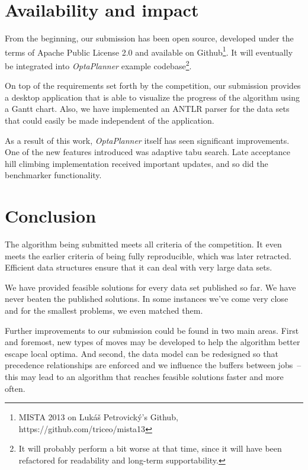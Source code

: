 \documentclass[10pt,a4paper]{article}
\begin{document}
\section{Availability and impact}

From the beginning, our submission has been open source, developed under the terms of Apache Public License 2.0 and available on Github\footnote{MISTA 2013 on Lukáš Petrovický's Github, https://github.com/triceo/mista13}. It will eventually be integrated into \textit{OptaPlanner} example codebase\footnote{It will probably perform a bit worse at that time, since it will have been refactored for readability and long-term supportability.}.

On top of the requirements set forth by the competition, our submission provides a desktop application that is able to visualize the progress of the algorithm using a Gantt chart. Also, we have implemented an ANTLR parser for the data sets that could easily be made independent of the application.

As a result of this work, \textit{OptaPlanner} itself has seen significant improvements. One of the new features introduced was adaptive tabu search. Late acceptance hill climbing implementation received important updates, and so did the benchmarker functionality.

\section{Conclusion}

The algorithm being submitted meets all criteria of the competition. It even meets the earlier criteria of being fully reproducible, which was later retracted. Efficient data structures ensure that it can deal with very large data sets.

We have provided feasible solutions for every data set published so far. We have never beaten the published solutions. In some instances we've come very close and for the smallest problems, we even matched them.

Further improvements to our submission could be found in two main areas. First and foremost, new types of moves may be developed to help the algorithm better escape local optima. And second, the data model can be redesigned so that precedence relationships are enforced and we influence the buffers between jobs~-- this may lead to an algorithm that reaches feasible solutions faster and more often.
\end{document}
